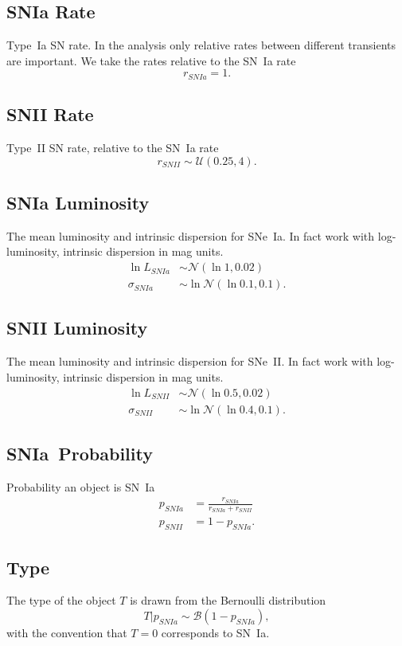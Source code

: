 \documentclass[preprint,3p]{elsarticle}
\begin{document}
\subsection{SNIa Rate}
Type~Ia SN rate. In the analysis only relative rates between different transients are important.
We take the rates relative to the SN~Ia rate
\begin{equation}
r_{SNIa} = 1.
\end{equation}

\subsection{SNII Rate}
Type~II SN rate, relative to the SN~Ia rate
\begin{equation}
r_{SNII} \sim \mathcal{U}(0.25, 4).
\end{equation}

\subsection{SNIa Luminosity}
The mean luminosity and intrinsic dispersion for SNe~Ia. In fact work with log-luminosity, intrinsic
dispersion in mag units.
\begin{align}
\ln{L}_{SNIa} & \sim \mathcal{N}(\ln{1}, 0.02) \\
\sigma_{SNIa} & \sim \ln{\mathcal{N}}(\ln{0.1},0.1).
\end{align}

\subsection{SNII Luminosity}
The mean luminosity and intrinsic dispersion for SNe~II. In fact work with log-luminosity, intrinsic
dispersion in mag units.
\begin{align}
\ln{L}_{SNII} & \sim \mathcal{N}(\ln{0.5}, 0.02) \\
\sigma_{SNII} & \sim \ln{\mathcal{N}}(\ln{0.4},0.1).
\end{align}

\subsection{SNIa~Probability}
Probability an object is SN~Ia
\begin{align}
p_{SNIa} &= \frac{r_{SNIa}}{r_{SNIa}+r_{SNII}} \nonumber \\
p_{SNII}&=1-p_{SNIa}.
\label{prob:eqn}
\end{align}
\subsection{Type}
The type of the object $T$ is drawn from the Bernoulli distribution 
\begin{equation}
T | p_{SNIa} \sim \mathcal{B}(1-p_{SNIa}),
\end{equation}
with the convention that $T=0$ corresponds to SN~Ia.
\end{document}
